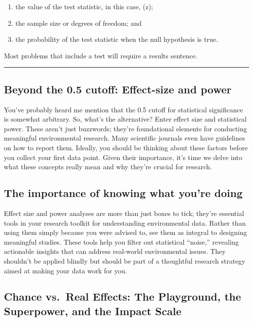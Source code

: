 \documentclass[
  letterpaper,
  DIV=11,
  numbers=noendperiod]{scrreprt}
\providecommand{\tightlist}{%
  \setlength{\itemsep}{0pt}\setlength{\parskip}{0pt}}\usepackage{longtable,booktabs,array}
\begin{document}
\begin{enumerate}
\def\labelenumi{\arabic{enumi})}
\tightlist
\item
  the value of the test statistic, in this case, (z);
\item
  the sample size or degrees of freedom; and
\item
  the probability of the test statistic when the null hypothesis is
  true.
\end{enumerate}

Most problems that include a test will require a results sentence.

\begin{center}\rule{0.5\linewidth}{0.5pt}\end{center}

\subsection{Beyond the 0.5 cutoff: Effect-size and
power}\label{beyond-the-0.5-cutoff-effect-size-and-power}

You've probably heard me mention that the 0.5 cutoff for statistical
significance is somewhat arbitrary. So, what's the alternative? Enter
effect size and statistical power. These aren't just buzzwords; they're
foundational elements for conducting meaningful environmental research.
Many scientific journals even have guidelines on how to report them.
Ideally, you should be thinking about these factors before you collect
your first data point. Given their importance, it's time we delve into
what these concepts really mean and why they're crucial for research.

\subsection{The importance of knowing what you're
doing}\label{the-importance-of-knowing-what-youre-doing}

Effect size and power analyses are more than just boxes to tick; they're
essential tools in your research toolkit for understanding environmental
data. Rather than using them simply because you were advised to, see
them as integral to designing meaningful studies. These tools help you
filter out statistical ``noise,'' revealing actionable insights that can
address real-world environmental issues. They shouldn't be applied
blindly but should be part of a thoughtful research strategy aimed at
making your data work for you.

\subsection{Chance vs.~Real Effects: The Playground, the Superpower, and
the Impact
Scale}\label{chance-vs.-real-effects-the-playground-the-superpower-and-the-impact-scale}
\end{document}
